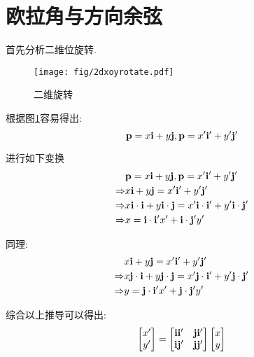 
\section{欧拉角与方向余弦}
首先分析二维位旋转.
\begin{figure}[!hbp]
    \begin{center}
        \texttt{[image: fig/2dxoyrotate.pdf]}
        \caption{二维旋转}\label{二维旋转}
    \end{center}
\end{figure}

根据图\ref{二维旋转}容易得出:
\begin{equation*}
    \mathbf{p}=x\mathbf{i}+y\mathbf{j},
    \mathbf{p}=x'\mathbf{i}'+y'\mathbf{j}' \\ 
\end{equation*} 

进行如下变换
\begin{equation*}
    \begin{split}
                    & \mathbf{p}=x\mathbf{i}+y\mathbf{j}, \mathbf{p}=x'\mathbf{i}'+y'\mathbf{j}' \\
        \Rightarrow & x\mathbf{i}+y\mathbf{j}=x'\mathbf{i}'+y'\mathbf{j}' \\
        \Rightarrow & x\mathbf{i}\cdot\mathbf{i}+y\mathbf{i}\cdot\mathbf{j}=x'\mathbf{i}\cdot\mathbf{i}'+y'\mathbf{i}\cdot\mathbf{j}' \\
        \Rightarrow & x=\mathbf{i}\cdot\mathbf{i}'x'+\mathbf{i}\cdot\mathbf{j}'y'
    \end{split}
\end{equation*} 

同理:
\begin{equation*}
    \begin{split}
                    & x\mathbf{i}+y\mathbf{j}=x'\mathbf{i}'+y'\mathbf{j}' \\
        \Rightarrow & x\mathbf{j}\cdot\mathbf{i}+y\mathbf{j}\cdot\mathbf{j}=x'\mathbf{j}\cdot\mathbf{i}'+y'\mathbf{j}\cdot\mathbf{j}' \\
        \Rightarrow & y=\mathbf{j}\cdot\mathbf{i}'x'+\mathbf{j}\cdot\mathbf{j}'y'
    \end{split}
\end{equation*} 

综合以上推导可以得出:
\begin{equation}\label{二维方向余弦阵}
    \begin{split}
        \left[\begin{matrix}
                x' \\
                y'
        \end{matrix}\right]
        =
        \left[\begin{matrix}
                \mathbf{i}\mathbf{i}' & \mathbf{j}\mathbf{i}' \\
                \mathbf{i}\mathbf{j}' & \mathbf{j}\mathbf{j}'
        \end{matrix}\right]
        \left[\begin{matrix}
                x \\
                y
        \end{matrix}\right]
    \end{split}
\end{equation}

